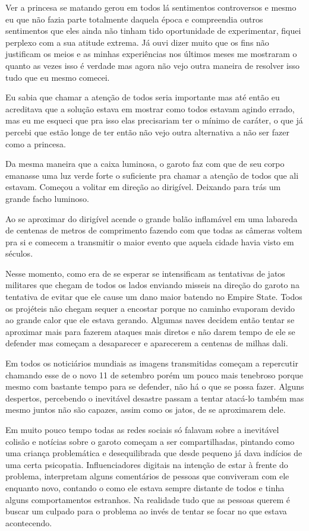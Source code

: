 Ver a princesa se matando gerou em todos lá sentimentos controversos e mesmo eu que não fazia parte totalmente daquela época e compreendia outros sentimentos que eles ainda não tinham tido oportunidade de experimentar, fiquei perplexo com a sua atitude extrema. Já ouvi dizer muito que os fins não justificam os meios e as minhas experiências nos últimos meses me mostraram o quanto as vezes isso é verdade mas agora não vejo outra maneira de resolver isso tudo que eu mesmo comecei.

Eu sabia que chamar a atenção de todos seria importante mas até então eu acreditava que a solução estava em mostrar como todos estavam agindo errado, mas eu me esqueci que pra isso elas precisariam ter o mínimo de caráter, o que já percebi que estão longe de ter então não vejo outra alternativa a não ser fazer como a princesa.

Da mesma maneira que a caixa luminosa, o garoto faz com que de seu corpo emanasse uma luz verde forte o suficiente pra chamar a atenção de todos que ali estavam. Começou a volitar em direção ao dirigível. Deixando para trás um grande facho luminoso.

Ao se aproximar do dirigível acende o grande balão inflamável em uma labareda de centenas de metros de comprimento fazendo com que todas as câmeras voltem pra si e comecem a transmitir o maior evento que aquela cidade havia visto em séculos.

Nesse momento, como era de se esperar se intensificam as tentativas de jatos militares que chegam de todos os lados enviando misseis na direção do garoto na tentativa de evitar que ele cause um dano maior batendo no Empire State. Todos os projéteis não chegam sequer a encostar porque no caminho evaporam devido ao grande calor que ele estava gerando. Algumas naves decidem então tentar se aproximar mais para fazerem ataques mais diretos e não darem tempo de ele se defender mas começam a desaparecer e aparecerem a centenas de milhas dali.

Em todos os noticiários mundiais as imagens transmitidas começam a repercutir chamando esse de o novo 11 de setembro porém um pouco mais tenebroso porque mesmo com bastante tempo para se defender, não há o que se possa fazer. Alguns despertos, percebendo o inevitável desastre passam a tentar atacá-lo também mas mesmo juntos não são capazes, assim como os jatos, de se aproximarem dele.

Em muito pouco tempo todas as redes sociais só falavam sobre a inevitável colisão e notícias sobre o garoto começam a ser compartilhadas, pintando como uma criança problemática e desequilibrada que desde pequeno já dava indícios de uma certa psicopatia. Influenciadores digitais na intenção de estar à frente do problema, interpretam alguns comentários de pessoas que conviveram com ele enquanto novo, contando o como ele estava sempre distante de todos e tinha alguns comportamentos estranhos.
Na realidade tudo que as pessoas querem é buscar um culpado para o problema ao invés de tentar se focar no que estava acontecendo.

